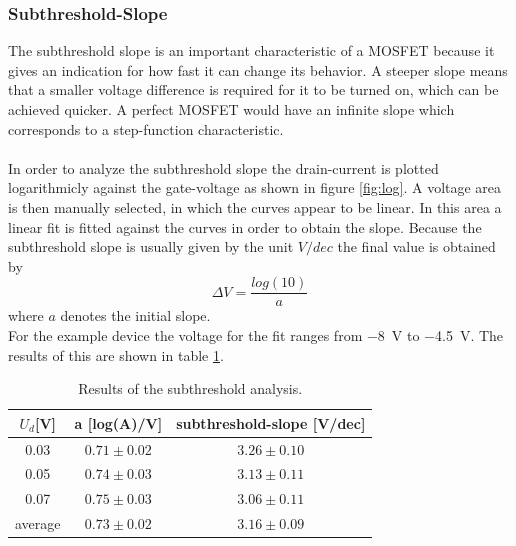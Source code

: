 \documentclass[%
 reprint,
amsmath,amssymb,
pra,
]{revtex4-1}
\begin{document}
\subsubsection{Subthreshold-Slope}

The subthreshold slope is an important characteristic of a MOSFET because it gives an indication for how fast it can change its behavior. A steeper slope means that a smaller voltage difference is required for it to be turned on, which can be achieved quicker. A perfect MOSFET would have an infinite slope which corresponds to a step-function characteristic.\\
\\
In order to analyze the subthreshold slope the drain-current is plotted logarithmicly against the gate-voltage as shown in figure \ref{fig:log}. A voltage area is then manually  selected, in which the curves appear to be linear. In this area a linear fit is fitted against the curves in order to obtain the slope. Because the subthreshold slope is usually given by the unit $\si{V/dec}$ the final value is obtained by
\begin{equation}
\Delta V = \dfrac{log(10)}{a}
\end{equation}
where $a$ denotes the initial slope.\\
For the example device the voltage for the fit ranges from \SI{-8}{V} to \SI{-4.5}{V}. The results of this are shown in table \ref{tab:subthreshold_example}.

\begin{table}[h]
\centering
\begin{tabular}{|c|c|c|}
\hline
$U_d$[\si{V}] & a [log(A)/V] & subthreshold-slope [V/dec] \\
\hline
0.03 & $0.71\pm 0.02$ & $3.26\pm 0.10$\\
\hline
0.05 & $0.74\pm 0.03$ & $3.13\pm 0.11$\\
\hline
0.07 & $0.75\pm 0.03$ & $3.06\pm 0.11$\\
\hline
average & $0.73\pm 0.02$ & $3.16\pm 0.09$\\
\hline
\end{tabular}
\caption{Results of the subthreshold analysis.}
\label{tab:subthreshold_example}
\end{table}
\end{document}

